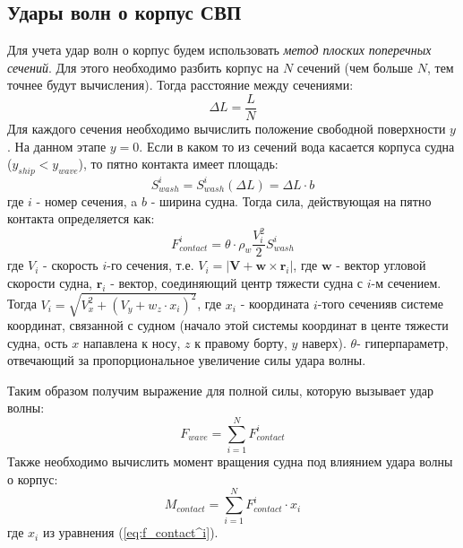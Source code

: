 \begin{centering}
    \subsection{Удары волн о корпус СВП}
\end{centering}

Для учета удар волн о корпус будем использовать {\it метод плоских поперечных сечений}. Для этого необходимо разбить корпус на $N$ сечений (чем больше $N$, тем точнее будут вычисления). Тогда расстояние между сечениями:
\begin{equation}
    \Delta L = \dfrac{L}{N}
\end{equation}
Для каждого сечения необходимо вычислить положение свободной поверхности $y$. На данном этапе $y=0$. Если в каком то из сечений вода касается корпуса судна ($y_{ship}<y_{wave}$), то пятно контакта имеет площадь:
\begin{equation}
    S^i_{wash} = S^i_{wash}(\Delta L) = \Delta L \cdot b
\end{equation}
где $i$ - номер сечения, a $b$ - ширина судна. Тогда сила, действующая на пятно контакта определяется как:
\begin{equation}\label{eq:f_contact^i}
    F^i_{contact} = \theta \cdot \rho_w \dfrac{V_i^2}{2}S^i_{wash}
\end{equation}
где $V_i$ - скорость $i$-го сечения, т.е. $V_i=|\mathbf{V}+\mathbf{w}\times\mathbf{r}_i|$, где $\mathbf{w}$ - вектор угловой скорости судна, $\mathbf{r}_i$ - вектор, соединяющий центр тяжести судна с $i$-м сечением. Тогда $V_i=\sqrt{V_x^2+(V_y + w_z \cdot x_i)^2}$, где $x_i$ - координата $i$-того сеченияв системе координат, связанной с судном (начало этой системы координат в центе тяжести судна, ость $x$ напавлена к носу, $z$ к правому борту, $y$ наверх). $\theta$- гиперпараметр, отвечающий за пропорциональное увеличение силы удара волны.

Таким образом получим выражение для полной силы, которую вызывает удар волны:
\begin{equation}
    F_{wave} = \sum_{i=1}^{N} F^i_{contact}
\end{equation}
Также необходимо вычислить момент вращения судна под влиянием удара волны о корпус:
\begin{equation}
    M_{contact} = \sum_{i=1}^{N} F^i_{contact} \cdot x_i
\end{equation}
где $x_i$ из уравнения (\ref{eq:f_contact^i}).

